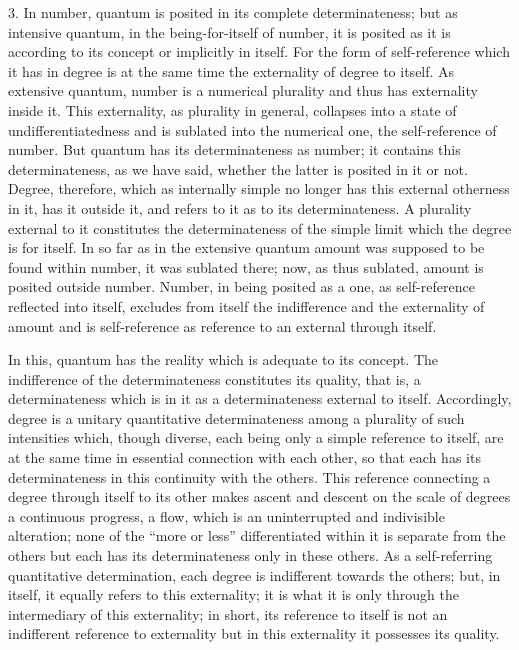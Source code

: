 3. In number, quantum is posited in its complete determinateness;
but as intensive quantum, in the being-for-itself of number,
it is posited as it is according to its concept or implicitly in itself.
For the form of self-reference which it has in degree is
at the same time the externality of degree to itself.
As extensive quantum, number is a numerical plurality
and thus has externality inside it.
This externality, as plurality in general,
collapses into a state of undifferentiatedness
and is sublated into the numerical one,
the self-reference of number.
But quantum has its determinateness as number;
it contains this determinateness, as we have said,
whether the latter is posited in it or not.
Degree, therefore, which as internally simple no
longer has this external otherness in it, has it outside it,
and refers to it as to its determinateness.
A plurality external to it constitutes the determinateness
of the simple limit which the degree is for itself.
In so far as in the extensive quantum
amount was supposed to be found within number,
it was sublated there;
now, as thus sublated, amount is posited outside number.
Number, in being posited as a one,
as self-reference reflected into itself,
excludes from itself the indifference and the externality of amount
and is self-reference as reference to an external through itself.

In this, quantum has the reality which is adequate to its concept.
The indifference of the determinateness constitutes its quality,
that is, a determinateness which is in it
as a determinateness external to itself.
Accordingly, degree is a unitary quantitative determinateness
among a plurality of such intensities
which, though diverse, each being only a simple reference to itself,
are at the same time in essential connection with each other,
so that each has its determinateness in this continuity with the others.
This reference connecting a degree through itself to its other
makes ascent and descent on the scale of degrees
a continuous progress, a flow,
which is an uninterrupted and indivisible alteration;
none of the “more or less” differentiated within it
is separate from the others
but each has its determinateness only in these others.
As a self-referring quantitative determination,
each degree is indifferent towards the others;
but, in itself, it equally refers to this externality;
it is what it is only through
the intermediary of this externality;
in short, its reference to itself is not
an indifferent reference to externality
but in this externality it possesses its quality.

